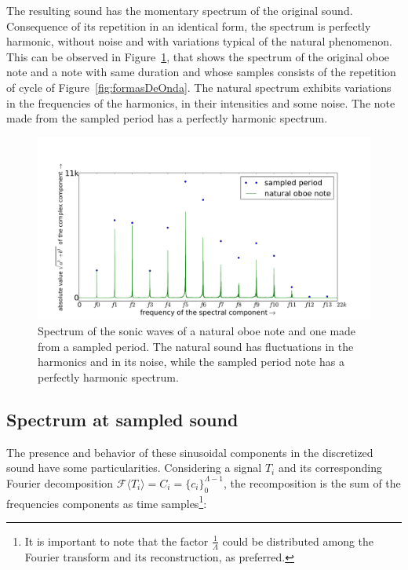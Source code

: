 \documentclass[
 aip,
 jmp,
 amsmath,amssymb,
 reprint,
]{revtex4-1}
\begin{document}
The resulting sound has the momentary spectrum of the original sound. Consequence of its repetition in an identical form, the spectrum is perfectly harmonic, without noise and with variations typical of the natural phenomenon. This can be observed in Figure~\ref{fig:espectroOboe}, that shows the spectrum of the original oboe note and a note with same duration and whose samples consists of the repetition of cycle of Figure~\ref{fig:formasDeOnda}. The natural spectrum exhibits variations in the frequencies of the harmonics, in their intensities and some noise. The note made from the sampled period has a perfectly harmonic spectrum.

\begin{figure}
    \centering
        \includegraphics[width=\columnwidth]{figures/oboeNaturalSampledSpectrum}
    \caption{Spectrum of the sonic waves of a natural oboe note and one made from a sampled period. The natural sound has fluctuations in the harmonics and in its noise, while the sampled period note has a perfectly harmonic spectrum.}
        \label{fig:espectroOboe}
\end{figure}


\subsection{Spectrum at sampled sound}

The presence and behavior of these sinusoidal components in the discretized sound have some particularities. Considering a signal $T_i$ and its corresponding Fourier decomposition $\mathcal{F}\langle T_i\rangle=C_i=\{c_i\}_0^{\Lambda-1}$, the recomposition is the sum of the frequencies components as time samples\footnote{It is important to note that the factor $\frac{1}{\Lambda}$ could be distributed among the Fourier transform and its reconstruction, as preferred.}:
\end{document}
